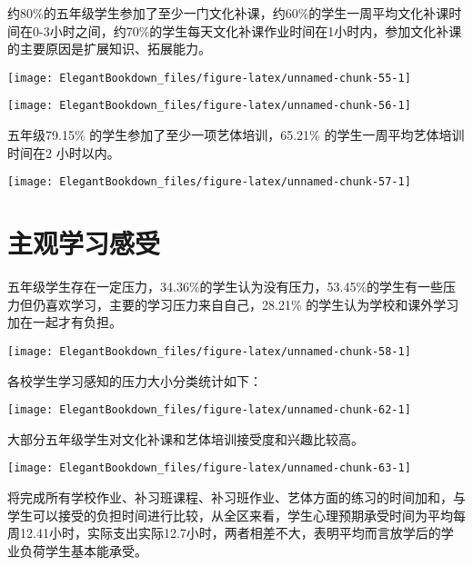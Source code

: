 \documentclass[cn, 11pt, fancy, hide]{elegantbook}
\begin{document}
约80\%的五年级学生参加了至少一门文化补课，约60\%的学生一周平均文化补课时间在0-3小时之间，约70\%的学生每天文化补课作业时间在1小时内，参加文化补课的主要原因是扩展知识、拓展能力。

\begin{center}\texttt{[image: ElegantBookdown\_files/figure-latex/unnamed-chunk-55-1]} \end{center}

\begin{center}\texttt{[image: ElegantBookdown\_files/figure-latex/unnamed-chunk-56-1]} \end{center}

五年级79.15\% 的学生参加了至少一项艺体培训，65.21\% 的学生一周平均艺体培训时间在2 小时以内。

\begin{center}\texttt{[image: ElegantBookdown\_files/figure-latex/unnamed-chunk-57-1]} \end{center}

\hypertarget{section-19}{%
\section{主观学习感受}\label{section-19}}

五年级学生存在一定压力，34.36\%的学生认为没有压力，53.45\%的学生有一些压力但仍喜欢学习，主要的学习压力来自自己，28.21\% 的学生认为学校和课外学习加在一起才有负担。

\begin{center}\texttt{[image: ElegantBookdown\_files/figure-latex/unnamed-chunk-58-1]} \end{center}

各校学生学习感知的压力大小分类统计如下：

\begin{center}\texttt{[image: ElegantBookdown\_files/figure-latex/unnamed-chunk-62-1]} \end{center}

大部分五年级学生对文化补课和艺体培训接受度和兴趣比较高。

\begin{center}\texttt{[image: ElegantBookdown\_files/figure-latex/unnamed-chunk-63-1]} \end{center}

将完成所有学校作业、补习班课程、补习班作业、艺体方面的练习的时间加和，与学生可以接受的负担时间进行比较，从全区来看，学生心理预期承受时间为平均每周12.41小时，实际支出实际12.7小时，两者相差不大，表明平均而言放学后的学业负荷学生基本能承受。
\end{document}
